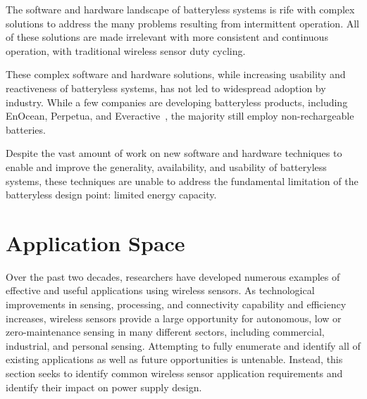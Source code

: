 The software and hardware landscape of batteryless systems is rife with complex solutions to address the many problems resulting from intermittent operation. All of these solutions are made irrelevant with more consistent and continuous operation, with traditional wireless sensor duty cycling.

These complex software and hardware solutions, while increasing usability and reactiveness of batteryless systems, has not led to widespread adoption by industry.
While a few companies are developing batteryless products, including EnOcean, Perpetua, and Everactive~\cite{enocean, perpetua, everactive}, the majority still employ non-rechargeable batteries.

Despite the vast amount of work on new software and hardware techniques to enable and improve the generality, availability, and usability of batteryless systems, these techniques are unable to address the fundamental limitation of the batteryless design point: limited energy capacity.


\section{Application Space}
Over the past two decades, researchers have developed numerous examples of effective and useful applications using wireless sensors.
As technological improvements in sensing, processing, and connectivity capability and efficiency increases, wireless sensors provide a large opportunity for autonomous, low or zero-maintenance sensing in many different sectors, including commercial, industrial, and personal sensing.
Attempting to fully enumerate and identify all of existing applications as well as future opportunities is untenable.
Instead, this section seeks to identify common wireless sensor application requirements and identify their impact on power supply design.

